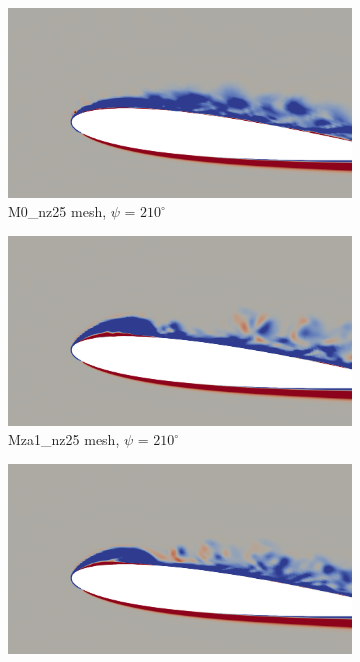 \begin{figure}[H]
	\centering
	\begin{center}
		\begin{subfigure}[b]{0.475\textwidth}
		\centering
		\includegraphics[width=1\textwidth]{figures/zonal_adapt_results/vorticity_plots/v2/M0/spavg/phase_210.png}
		\caption{M0\_nz25 mesh, $\psi$ = $210^\circ$}
		\label{fig:M0_sp_psi210}
		\end{subfigure}
	\end{center}
	\begin{subfigure}[b]{0.475\textwidth}
	\centering
	\includegraphics[width=1\textwidth]{figures/zonal_adapt_results/vorticity_plots/v2/Mza1_25/spavg/phase_210.png}
	\caption{Mza1\_nz25 mesh, $\psi$ = $210^\circ$}
	\label{fig:Mza1_25_sp_psi210}
	\end{subfigure}
	\begin{subfigure}[b]{0.475\textwidth}
		\centering
		\includegraphics[width=1\textwidth]{figures/zonal_adapt_results/vorticity_plots/v2/Mza1_50/spavg/phase_210.png}

\end{subfigure}
\end{figure}
